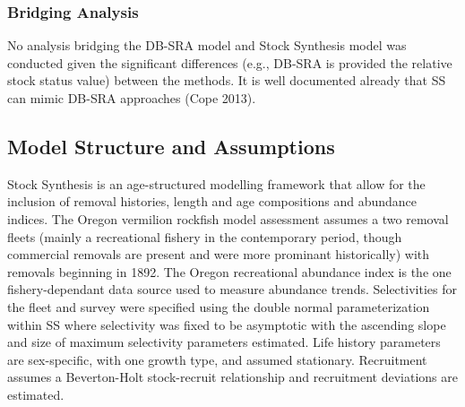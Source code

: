 \documentclass[11pt,
  english,
  a4paper,
]{article}
\begin{document}
\leavevmode\tagmcend\tagstructend\par


\hypertarget{bridging-analysis}{%
\subsubsection{Bridging Analysis}\label{bridging-analysis}}

\leavevmode\tagmcend\tagstructend


No analysis bridging the DB-SRA model and Stock Synthesis model was conducted given the significant differences (e.g., DB-SRA is provided the relative stock status value) between the methods. It is well documented already that SS can mimic DB-SRA approaches {(Cope 2013)\leavevmode\tagmcend\tagstructend}.

\leavevmode\tagmcend\tagstructend\par


\hypertarget{model-structure-and-assumptions}{%
\subsection{Model Structure and Assumptions}\label{model-structure-and-assumptions}}

\leavevmode\tagmcend\tagstructend


Stock Synthesis is an age-structured modelling framework that allow for the inclusion of removal histories, length and age compositions and abundance indices. The Oregon vermilion rockfish model assessment assumes a two removal fleets (mainly a recreational fishery in the contemporary period, though commercial removals are present and were more prominant historically) with removals beginning in 1892. The Oregon recreational abundance index is the one fishery-dependant data source used to measure abundance trends. Selectivities for the fleet and survey were specified using the double normal parameterization within SS where selectivity was fixed to be asymptotic with the ascending slope and size of maximum selectivity parameters estimated. Life history parameters are sex-specific, with one growth type, and assumed stationary. Recruitment assumes a Beverton-Holt stock-recruit relationship and recruitment deviations are estimated.
\end{document}
